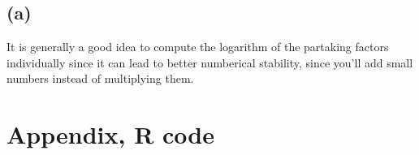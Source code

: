 \documentclass{article}
\begin{document}
\subsection{(a)}
It is generally a good idea to
compute the logarithm of the partaking factors individually
since it can lead to better numberical stability,
since you'll add small numbers instead of multiplying them.

\appendix
\section{Appendix, R code}
% 
\end{document}

